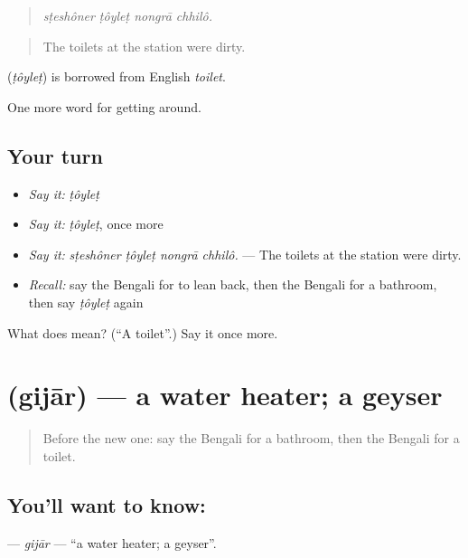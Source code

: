 \begin{quote}
\emph{sṭeshôner ṭôyleṭ nongrā chhilô.}
\end{quote}

\begin{quote}
The toilets at the station were dirty.
\end{quote}

\begin{cousinweb}
\textbf{} (\emph{ṭôyleṭ}) is borrowed from English \emph{toilet}.
\end{cousinweb}

\begin{grammarlens}[title={What you've built}]
One more word for getting around.
\end{grammarlens}

\subsection*{Your turn}
\begin{itemize}
\raggedright
  \item \emph{Say it:} \emph{ṭôyleṭ}
  \item \emph{Say it:} \emph{ṭôyleṭ}, once more
  \item \emph{Say it:} \emph{sṭeshôner ṭôyleṭ nongrā chhilô.} — The toilets at the station were dirty.
  \item \emph{Recall:} say the Bengali for to lean back, then the Bengali for a bathroom, then say \emph{ṭôyleṭ} again
\end{itemize}

\begin{tcolorbox}[breakable,colback=teal!4,colframe=teal!35!black,title={Before you move on}]
What does  mean? (\textquotedblleft{}A toilet\textquotedblright{}.) Say it once more.
\end{tcolorbox}
\section[\texorpdfstring{\bn{গিজার} (gijār)}{গিজার (gijār)}]{ (gijār) — a water heater; a geyser}

\label{lesson:BN-C405-gijar}



\begin{quote}
Before the new one: say the Bengali for a bathroom, then the Bengali for a toilet.
\end{quote}

\subsection*{You'll want to know: }
\textbf{} — \emph{gijār} — \textquotedblleft{}a water heater; a geyser\textquotedblright{}.

